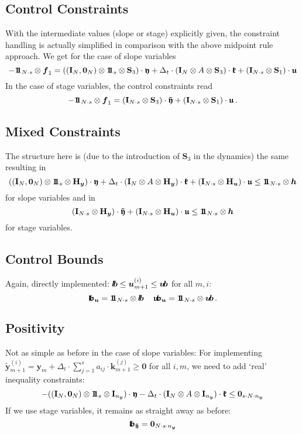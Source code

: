 \documentclass{article}
\newcommand{\kron}{\otimes}%
\newcommand{\vectorfont}[1]{\boldsymbol{#1}}%
\newcommand{\greekvectorfont}[1]{\boldsymbol{#1}}%
\newcommand{\matrixfont}[1]{\mathbf{#1}}%
\newcommand{\fvec}{\vectorfont{f}}
\newcommand{\hvec}{\vectorfont{h}}
\newcommand{\kvec}{\vectorfont{k}}
\newcommand{\uvec}{\vectorfont{u}}
\newcommand{\yvec}{\vectorfont{y}}
\newcommand{\tildeyvec}{\vectorfont{\tilde{y}}}
\newcommand{\kfrakvec}{\vectorfont{\mathfrak{k}}}
\newcommand{\ufrakvec}{\vectorfont{\mathfrak{u}}}
\newcommand{\yfrakvec}{\vectorfont{\mathfrak{y}}}
\newcommand{\tildeyfrakvec}{\vectorfont{\tilde{\mathfrak{y}}}}
\newcommand{\nullvec}{\greekvectorfont{0}}
\newcommand{\lbvec}{\vectorfont{l\negthinspace b}}
\newcommand{\ubvec}{\vectorfont{u\negthinspace b}}
\newcommand{\lbfrakvec}{\vectorfont{\mathfrak{l\negthinspace b}}}
\newcommand{\ubfrakvec}{\vectorfont{\mathfrak{u\negthinspace b}}}
\newcommand{\einsvec}{\vectorfont{1}\negthinspace\negthinspace\vectorfont{1}} %
\newcommand{\Hmat}{\matrixfont{H}}
\newcommand{\Imat}{\matrixfont{I}}%
\newcommand{\Smat}{\matrixfont{S}}
\begin{document}
%
\subsection*{Control Constraints}
%
With the intermediate values (slope or stage) explicitly given, the constraint handling is actually simplified in comparison with the above midpoint rule approach.
We get for the case of slope variables
\[
-\einsvec_{N\cdot s} \kron \fvec_1
 =  ((\Imat_{N},\nullvec_N)\kron \einsvec_s \kron \Smat_3)\cdot \yfrakvec
    + \Delta_t \cdot (\Imat_N \kron A \kron \Smat_3)\cdot \kfrakvec
    + (\Imat_{N\cdot s} \kron \Smat_1)\cdot \ufrakvec 
\]
In the case of stage variables, the control constraints read
\[
-\einsvec_{N\cdot s} \kron \fvec_1
 = (\Imat_{N\cdot s} \kron \Smat_3) \cdot \tildeyfrakvec + (\Imat_{N\cdot s} \kron \Smat_1) \cdot \ufrakvec\,. 
\]
%
\subsection*{Mixed Constraints}
%
The structure here is (due to the introduction of $\Smat_3$ in the dynamics) the same resulting in
\[
 ((\Imat_{N},\nullvec_N)\kron \einsvec_s \kron \Hmat_{\yvec})\cdot \yfrakvec
+ \Delta_t \cdot (\Imat_N \kron A \kron \Hmat_{\yvec})\cdot \kfrakvec
+ (\Imat_{N\cdot s} \kron \Hmat_{\uvec})\cdot \ufrakvec 
\leq
\einsvec_{N\cdot s} \kron \hvec
\]
for slope variables and in
\[
(\Imat_{N\cdot s} \kron \Hmat_{\yvec}) \cdot \tildeyfrakvec + (\Imat_{N\cdot s} \kron \Hmat_{\uvec}) \cdot \ufrakvec \leq \einsvec_{N\cdot s} \kron \hvec
\]
for stage variables.


%
\subsection*{Control Bounds}
%
Again, directly implemented: $\lbvec \leq \uvec_{m+1}^{(i)} \leq \ubvec$ for all $m,i$:
\[
\lbfrakvec_{\uvec} = \einsvec_{N\cdot s} \kron \lbvec\,\quad
\ubfrakvec_{\uvec} = \einsvec_{N\cdot s} \kron \ubvec\,.
\]

%
\subsection*{Positivity}
%
Not as simple as before in the case of slope variables:
For implementing
$
\tildeyvec_{m+1}^{(i)} = \yvec_m + \Delta_t \cdot \sum_{j=1}^s a_{ij}\cdot \kvec_{m+1}^{(j)}\geq \nullvec
$
for all $i,m$, we need to add `real' inequality constraints:
\[
-((\Imat_{N} ,\nullvec_N) \kron \einsvec_s \kron \Imat_{n_{\yvec}}) \cdot \yfrakvec - \Delta_t \cdot (\Imat_{N} \kron A \kron \Imat_{n_{\yvec}}) \cdot \kfrakvec \leq \nullvec_{s\cdot N \cdot n_{\yvec}}
\]
If we use stage variables, it remains as straight away as before:
\[
\lbfrakvec_{\tildeyfrakvec} = \nullvec_{N \cdot s \cdot n_{\yvec}}
\]
\end{document}
